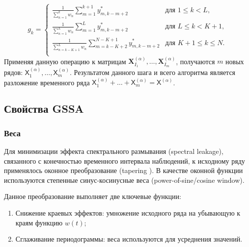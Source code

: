 \documentclass[a4paper, 11pt]{article}
\newcommand{\TS}{\mathsf{X}}
\begin{document}
\begin{equation*}
	g_{k}=
	\begin{cases}
		\frac{1}{\sum_{n = 1}^k w_n} \sum\limits_{m=1}^{k+1} y_{m,k-m+2}^{*}           &
		\text{для } 1 \leq k < L,                                                        \\

		\frac{1}{\sum_{n = 1}^L w_n} \sum\limits_{m=1}^{L} y_{m,k-m+2}^{*}             &
		\text{для } L \leq k < K+1 ,                                                     \\

		\frac{1}{\sum_{n = k-K+1}^L w_n} \sum\limits_{m=k-K+2}^{N-K+1} y_{m,k-m+2}^{*} &
		\text{для } K+1 \leq k \leq N .                                                  \\
	\end{cases}
\end{equation*}
Применяя данную операцию к матрицам $\mathbf{X}_{I_1}^{(\alpha)}, \dots, \mathbf{X}_{I_m}^{(\alpha)}$, получаются $m$ новых рядов: $\TS^{(\alpha)}_1, \dots, \TS^{(\alpha)}_m$.
Результатом данного шага и всего алгоритма является разложение временного ряда $\TS^{(\alpha)}_1 + \dots + \TS^{(\alpha)}_m = \TS^{(\alpha)}$.



\subsection{Свойства GSSA}

\subsubsection{Веса}

Для минимизации эффекта спектрального размывания (spectral leakage), связанного с конечностью временного интервала наблюдений, к исходному ряду применялось оконное преобразование (tapering \cite{weisstein2002crc}). В качестве оконной функции используются степенные синус-косинусные веса (power-of-sine/cosine window).

Данное преобразование выполняет две ключевые функции:
\begin{enumerate}
	\item Снижение краевых эффектов: умножение исходного ряда на убывающую к краям функцию \( w(t) \);
	\item Сглаживание периодограммы: веса используются для усреднения значений.
\end{enumerate}
\end{document}
